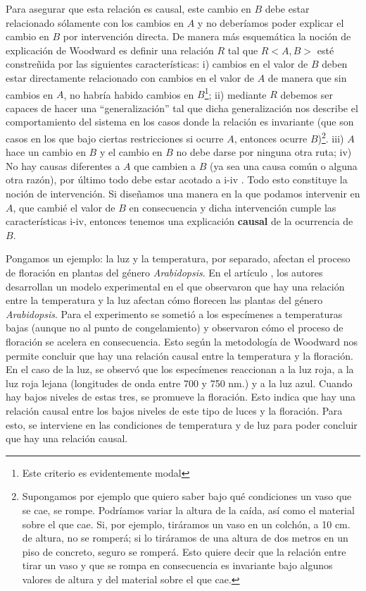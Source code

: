  Para asegurar que esta relación es causal, este cambio en $B$ debe estar relacionado sólamente con los cambios en $A$ y no deberíamos poder explicar el cambio en $B$ por intervención directa. De manera más esquemática la noción de explicación de Woodward es definir una relación $R$ tal que $R<A, B>$ esté constreñida por las siguientes características: i) cambios en el valor de $B$ deben estar directamente relacionado con cambios en el valor de $A$ de manera que sin cambios en $A$, no habría habido cambios en $B$\footnote{Este criterio es evidentemente modal}; ii) mediante $R$ debemos ser capaces de hacer una ``generalización'' tal que dicha generalización nos describe el comportamiento del sistema en los casos donde la relación es invariante (que son casos en los que bajo ciertas restricciones si ocurre $A$, entonces ocurre $B$)\footnote{Supongamos por ejemplo que quiero saber bajo qué condiciones un vaso que se cae, se rompe. Podríamos variar la altura de la caída, así como el material sobre el que cae. Si, por ejemplo, tiráramos un vaso en un colchón, a 10 cm. de altura, no se romperá; si lo tiráramos de una altura de dos metros en un piso de concreto, seguro se romperá. Esto quiere decir que la relación entre tirar un vaso y que se rompa en consecuencia es invariante bajo algunos valores de altura y del material sobre el que cae.}.  iii) $A$ hace un cambio en $B$ y el cambio en $B$ no debe darse por ninguna otra ruta; iv) No hay causas diferentes a $A$ que cambien a $B$ (ya sea una causa común o alguna otra razón), por último todo debe estar acotado a i-iv \cite[p. 201]{Woodward2000}. Todo esto constituye la noción de intervención. Si diseñamos una manera en la que podamos intervenir en $A$, que cambié el valor de $B$ en consecuencia y dicha intervención cumple las características i-iv, entonces tenemos una explicación \textbf{causal} de la ocurrencia de $B$.

 Pongamos un ejemplo: la luz y la temperatura, por separado, afectan el proceso de floración en plantas del género \emph{Arabidopsis}. En el artículo \cite{AusinEnviro}, los autores desarrollan un modelo experimental en el que observaron que hay una relación entre la temperatura y la luz afectan cómo florecen las plantas del género \emph{Arabidopsis}. Para el experimento se sometió a los especímenes a temperaturas bajas (aunque no al punto de congelamiento) y observaron cómo el proceso de floración se acelera en consecuencia. Esto según la metodología de Woodward nos permite concluir que hay una relación causal entre la temperatura y la floración. En el caso de la luz, se observó que los especímenes reaccionan a la luz roja, a la luz roja lejana (longitudes de onda entre 700 y 750 nm.) y a la luz azul. Cuando hay bajos niveles de estas tres, se promueve la floración. Esto indica que hay una relación causal entre los bajos niveles de este tipo de luces y la floración. Para esto, se interviene en las condiciones de temperatura y de luz para poder concluir que hay una relación causal.

